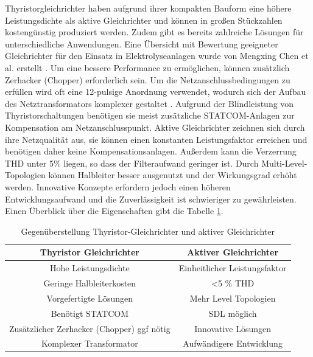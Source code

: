 Thyristorgleichrichter haben aufgrund ihrer kompakten Bauform eine höhere Leistungsdichte als aktive Gleichrichter und können in großen Stückzahlen kostengünstig produziert werden. Zudem gibt es bereits zahlreiche Lösungen für unterschiedliche Anwendungen. Eine Übersicht mit Bewertung geeigneter Gleichrichter für den Einsatz in Elektrolyseanlagen wurde von Mengxing Chen et al. erstellt \cite{HydrogenElectronicTopologies}. Um eine bessere Performance zu ermöglichen, können zusätzlich Zerhacker (Chopper) erforderlich sein. Um die Netzanschlussbedingungen zu erfüllen wird oft eine 12-pulsige Anordnung verwendet, wodurch sich der Aufbau des Netztransformators komplexer gestaltet \cite{HydrogenRectInf}. Aufgrund der Blindleistung von Thyristorschaltungen benötigen sie meist zusätzliche STATCOM-Anlagen zur Kompensation am Netzanschlusspunkt. Aktive Gleichrichter zeichnen sich durch ihre Netzqualität aus, sie können einen konstanten Leistungsfaktor erreichen und benötigen daher keine Kompensationsanlagen. Außerdem kann die Verzerrung \gls{THD} unter 5\% liegen, so dass der Filteraufwand geringer ist. Durch Multi-Level-Topologien können Halbleiter besser ausgenutzt und der Wirkungsgrad erhöht werden. Innovative Konzepte erfordern jedoch einen höheren Entwicklungsaufwand und die Zuverlässigkeit ist schwieriger zu gewährleisten. Einen Überblick über die Eigenschaften gibt die Tabelle \ref{tab:thyVSafe}. 
\begin{table}[t]
	\centering
	\caption{Gegenüberstellung Thyristor-Gleichrichter und aktiver Gleichrichter}
	\label{tab:thyVSafe}
	\begin{tabular}{c|c} 
		\textbf{Thyristor Gleichrichter} & \textbf{Aktiver Gleichrichter} \\
		\hline
		Hohe Leistungsdichte & Einheitlicher Leistungsfaktor \\
		\hline
		Geringe Halbleiterkosten & <5 \% \gls{THD} \\
		\hline
		Vorgefertigte Lösungen & Mehr Level Topologien  \\
		\hline
		Benötigt STATCOM &  \gls{SDL} möglich \\
		\hline
		Zusätzlicher Zerhacker (Chopper) ggf  nötig & Innovative Lösungen \\
		\hline
		Komplexer Transformator & Aufwändigere Entwicklung \\
	\end{tabular}
\end{table}
